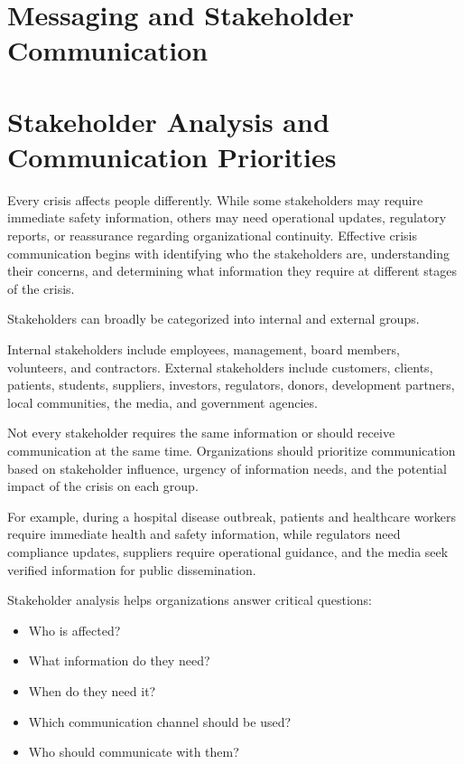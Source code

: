 \documentclass[10pt]{article}
\begin{document}
\section*{Messaging and Stakeholder Communication}

\section*{Stakeholder Analysis and Communication Priorities}

Every crisis affects people differently. While some stakeholders may require immediate safety information, others may need operational updates, regulatory reports, or reassurance regarding organizational continuity. Effective crisis communication begins with identifying who the stakeholders are, understanding their concerns, and determining what information they require at different stages of the crisis.

Stakeholders can broadly be categorized into internal and external groups.

Internal stakeholders include employees, management, board members, volunteers, and contractors. External stakeholders include customers, clients, patients, students, suppliers, investors, regulators, donors, development partners, local communities, the media, and government agencies.

Not every stakeholder requires the same information or should receive communication at the same time. Organizations should prioritize communication based on stakeholder influence, urgency of information needs, and the potential impact of the crisis on each group.

For example, during a hospital disease outbreak, patients and healthcare workers require immediate health and safety information, while regulators need compliance updates, suppliers require operational guidance, and the media seek verified information for public dissemination.

Stakeholder analysis helps organizations answer critical questions:
\begin{itemize}
    \item Who is affected?
    \item What information do they need?
    \item When do they need it?
    \item Which communication channel should be used?
    \item Who should communicate with them?
\end{itemize}
\end{document}
